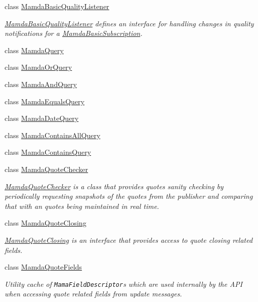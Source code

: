 \begin{CompactItemize}
class \hyperlink{classWombat_1_1MamdaBasicQualityListener}{Mamda\-Basic\-Quality\-Listener}
\begin{CompactList}\small\item\em \hyperlink{classWombat_1_1MamdaBasicQualityListener}{Mamda\-Basic\-Quality\-Listener} defines an interface for handling changes in quality notifications for a \hyperlink{classWombat_1_1MamdaBasicSubscription}{Mamda\-Basic\-Subscription}. \item\end{CompactList}\item 
class \hyperlink{classWombat_1_1MamdaQuery}{Mamda\-Query}
\item 
class \hyperlink{classWombat_1_1MamdaOrQuery}{Mamda\-Or\-Query}
\item 
class \hyperlink{classWombat_1_1MamdaAndQuery}{Mamda\-And\-Query}
\item 
class \hyperlink{classWombat_1_1MamdaEqualsQuery}{Mamda\-Equals\-Query}
\item 
class \hyperlink{classWombat_1_1MamdaDateQuery}{Mamda\-Date\-Query}
\item 
class \hyperlink{classWombat_1_1MamdaContainsAllQuery}{Mamda\-Contains\-All\-Query}
\item 
class \hyperlink{classWombat_1_1MamdaContainsQuery}{Mamda\-Contains\-Query}
\item 
class \hyperlink{classWombat_1_1MamdaQuoteChecker}{Mamda\-Quote\-Checker}
\begin{CompactList}\small\item\em \hyperlink{classWombat_1_1MamdaQuoteChecker}{Mamda\-Quote\-Checker} is a class that provides quotes sanity checking by periodically requesting snapshots of the quotes from the publisher and comparing that with an quotes being maintained in real time. \item\end{CompactList}\item 
class \hyperlink{classWombat_1_1MamdaQuoteClosing}{Mamda\-Quote\-Closing}
\begin{CompactList}\small\item\em \hyperlink{classWombat_1_1MamdaQuoteClosing}{Mamda\-Quote\-Closing} is an interface that provides access to quote closing related fields. \item\end{CompactList}\item 
class \hyperlink{classWombat_1_1MamdaQuoteFields}{Mamda\-Quote\-Fields}
\begin{CompactList}\small\item\em Utility cache of {\tt Mama\-Field\-Descriptor}s which are used internally by the API when accessing quote related fields from update messages. \item\end{CompactList}\item 

\end{CompactItemize}
